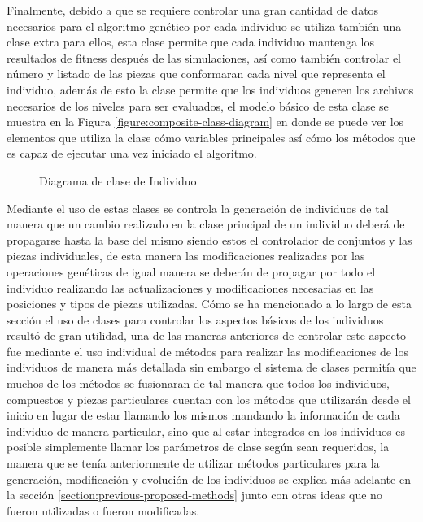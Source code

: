 Finalmente, debido a que se requiere controlar una gran cantidad de datos
necesarios para el algoritmo genético por cada individuo se utiliza también una
clase extra para ellos, esta clase permite que cada individuo mantenga los
resultados de fitness después de las simulaciones, así como también controlar el
número y listado de las piezas que conformaran cada nivel que representa el
individuo, además de esto la clase permite que los individuos generen los
archivos necesarios de los niveles para ser evaluados, el modelo básico de esta
clase se muestra en la Figura \ref{figure:composite-class-diagram} en donde se
puede ver los elementos que utiliza la clase cómo variables principales así cómo
los métodos que es capaz de ejecutar una vez iniciado el algoritmo.

\begin{figure}
  \centering
  \scalebox{.65}{}
  \caption{Diagrama de clase de Individuo}
  \label{figure:individual-class-diagram}
\end{figure}

Mediante el uso de estas clases se controla la generación de individuos de tal
manera que un cambio realizado en la clase principal de un individuo deberá de
propagarse hasta la base del mismo siendo estos el controlador de conjuntos y
las piezas individuales, de esta manera las modificaciones realizadas por las
operaciones genéticas de igual manera se deberán de propagar por todo el
individuo realizando las actualizaciones y modificaciones necesarias en las
posiciones y tipos de piezas utilizadas. Cómo se ha mencionado a lo largo de
esta sección el uso de clases para controlar los aspectos básicos de los
individuos resultó de gran utilidad, una de las maneras anteriores de controlar
este aspecto fue mediante el uso individual de métodos para realizar las
modificaciones de los individuos de manera más detallada sin embargo el sistema
de clases permitía que muchos de los métodos se fusionaran de tal manera que
todos los individuos, compuestos y piezas particulares cuentan con los métodos
que utilizarán desde el inicio en lugar de estar llamando los mismos mandando la
información de cada individuo de manera particular, sino que al estar integrados
en los individuos es posible simplemente llamar los parámetros de clase según
sean requeridos, la manera que se tenía anteriormente de utilizar métodos
particulares para la generación, modificación y evolución de los individuos se
explica más adelante en la sección \ref{section:previous-proposed-methods} junto
con otras ideas que no fueron utilizadas o fueron modificadas.

